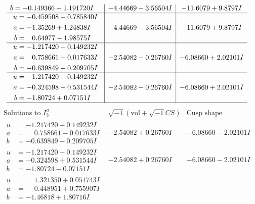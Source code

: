 \documentclass[1p]{elsarticle_modified}
\theoremstyle{definition}
\newcommand{\I}{\sqrt{-1}}
\begin{document}
$$\begin{array}{c|c|c}
\begin{aligned}
b &= -0.149366 + 1.191720 I\end{aligned}
 & -4.44669 - 3.56504 I & -11.6079 + 9.8797 I \\ \hline\begin{aligned}
u &= -0.459508 - 0.785840 I \\
a &= -1.35269 + 1.24838 I \\
b &= \phantom{-}0.64977 - 1.98575 I\end{aligned}
 & -4.44669 - 3.56504 I & -11.6079 + 9.8797 I \\ \hline\begin{aligned}
u &= -1.217420 + 0.149232 I \\
a &= \phantom{-}0.758661 + 0.017633 I \\
b &= -0.639849 + 0.209705 I\end{aligned}
 & -2.54082 - 0.26760 I & -6.08660 + 2.02101 I \\ \hline\begin{aligned}
u &= -1.217420 + 0.149232 I \\
a &= -0.324598 - 0.531544 I \\
b &= -1.80724 + 0.07151 I\end{aligned}
 & -2.54082 - 0.26760 I & -6.08660 + 2.02101 I\\
 \hline 
 \end{array}$$\newpage$$\begin{array}{c|c|c}  
\text{Solutions to }I^u_{3}& \I (\text{vol} + \sqrt{-1}CS) & \text{Cusp shape}\\
 \hline 
\begin{aligned}
u &= -1.217420 - 0.149232 I \\
a &= \phantom{-}0.758661 - 0.017633 I \\
b &= -0.639849 - 0.209705 I\end{aligned}
 & -2.54082 + 0.26760 I & -6.08660 - 2.02101 I \\ \hline\begin{aligned}
u &= -1.217420 - 0.149232 I \\
a &= -0.324598 + 0.531544 I \\
b &= -1.80724 - 0.07151 I\end{aligned}
 & -2.54082 + 0.26760 I & -6.08660 - 2.02101 I \\ \hline\begin{aligned}
u &= \phantom{-}1.321350 + 0.051743 I \\
a &= \phantom{-}0.448951 + 0.755907 I \\
b &= -1.46818 + 1.80716 I\end{aligned}

\end{array}$$
\end{document}
